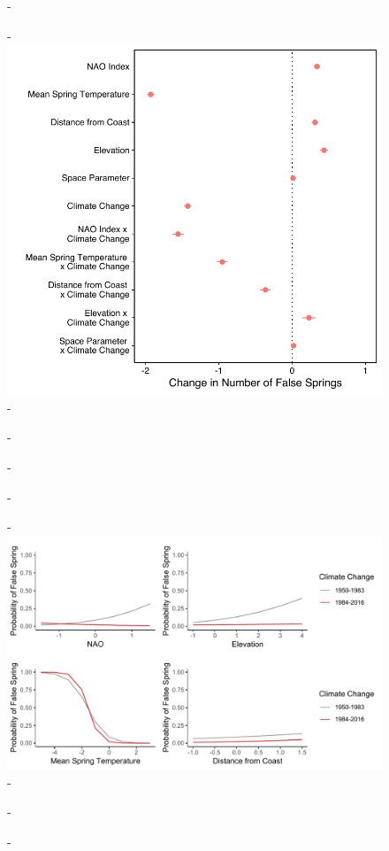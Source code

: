 \documentclass{article}\usepackage[]{graphicx}\usepackage[]{color}
\begin{document}
{\begin{figure} [H]
  -\begin{center}
  -\includegraphics[width=16cm]{..//figures/model_output_dvr.pdf}
  -\caption{}\label{fig:maineffects}
  -\end{center}
  -\end{figure}}
  

{\begin{figure} [H]
  -\begin{center}
  -\includegraphics[width=16cm]{..//figures/InteractionPlots/IntrxnPlots_dvr.pdf}
  -\caption{}\label{fig:intrxns}
  -\end{center}
  -\end{figure}}
\end{document}

